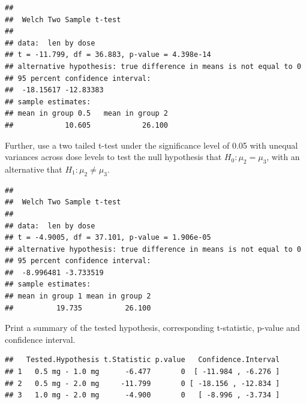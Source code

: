 \documentclass[]{article}
\newenvironment{Shaded}{\begin{snugshade}}{\end{snugshade}}
\newcommand{\KeywordTok}[1]{\textcolor[rgb]{0.13,0.29,0.53}{\textbf{#1}}}
\newcommand{\DataTypeTok}[1]{\textcolor[rgb]{0.13,0.29,0.53}{#1}}
\newcommand{\DecValTok}[1]{\textcolor[rgb]{0.00,0.00,0.81}{#1}}
\newcommand{\StringTok}[1]{\textcolor[rgb]{0.31,0.60,0.02}{#1}}
\newcommand{\OperatorTok}[1]{\textcolor[rgb]{0.81,0.36,0.00}{\textbf{#1}}}
\newcommand{\NormalTok}[1]{#1}
\begin{document}
\begin{verbatim}
## 
##  Welch Two Sample t-test
## 
## data:  len by dose
## t = -11.799, df = 36.883, p-value = 4.398e-14
## alternative hypothesis: true difference in means is not equal to 0
## 95 percent confidence interval:
##  -18.15617 -12.83383
## sample estimates:
## mean in group 0.5   mean in group 2 
##            10.605            26.100
\end{verbatim}

Further, use a two tailed t-test under the significance level of 0.05
with unequal variances across dose levels to test the null hypothesis
that \(H_0: \mu_2=\mu_3\), with an alternative that
\(H_1: \mu_2\ne\mu_3\).

\begin{Shaded}
\end{Shaded}

\begin{verbatim}
## 
##  Welch Two Sample t-test
## 
## data:  len by dose
## t = -4.9005, df = 37.101, p-value = 1.906e-05
## alternative hypothesis: true difference in means is not equal to 0
## 95 percent confidence interval:
##  -8.996481 -3.733519
## sample estimates:
## mean in group 1 mean in group 2 
##          19.735          26.100
\end{verbatim}

\newpage

Print a summary of the tested hypothesis, corresponding t-statistic,
p-value and confidence interval.

\begin{verbatim}
##   Tested.Hypothesis t.Statistic p.value   Confidence.Interval
## 1   0.5 mg - 1.0 mg      -6.477       0  [ -11.984 , -6.276 ]
## 2   0.5 mg - 2.0 mg     -11.799       0 [ -18.156 , -12.834 ]
## 3   1.0 mg - 2.0 mg      -4.900       0   [ -8.996 , -3.734 ]
\end{verbatim}
\end{document}
